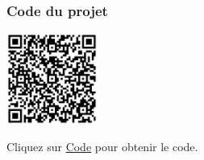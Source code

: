 \documentclass[a4paper,12pt]{report}
\begin{document}
\subsubsection{Code du projet}

\begin{minipage}{0.5\textwidth}
    \includegraphics[height=3cm]{Code TC204.png}
\end{minipage}%
\begin{minipage}{0.5\textwidth}
    Cliquez sur \href{https://github.com/DexterTaha/Controllino-PLC-Sample/blob/main/TC200/TC204_Circuit_%C3%A9toile_triangle/TC204_Circuit_%C3%A9toile_triangle.ino}{Code} pour obtenir le code.
\end{minipage}

\newpage
\end{document}
